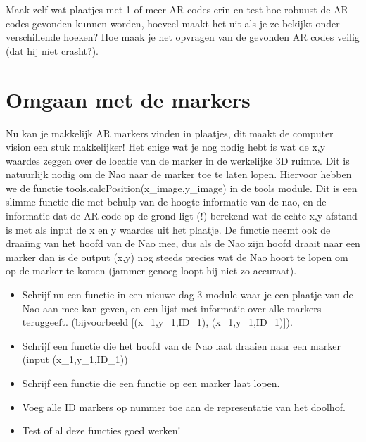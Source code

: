 \documentclass[a4paper]{article}
\begin{document}
\begin{Exercise}
Maak zelf wat plaatjes met 1 of meer AR codes erin en test hoe robuust de AR codes gevonden kunnen worden, hoeveel maakt het uit als je ze bekijkt onder verschillende hoeken? Hoe maak je het opvragen van de gevonden AR codes veilig (dat hij niet crasht?). 
\end{Exercise}
\vspace{10 mm}

\section{Omgaan met de markers}

Nu kan je makkelijk AR markers vinden in plaatjes, dit maakt de computer vision een stuk makkelijker! Het enige wat je nog nodig hebt is wat de x,y waardes zeggen over de locatie van de marker in de werkelijke 3D ruimte. Dit is natuurlijk nodig om de Nao naar de marker toe te laten lopen. Hiervoor hebben we de functie tools.calcPosition(x\_image,y\_image) in de tools module. Dit is een slimme functie die met behulp van de hoogte informatie van de nao, en de informatie dat de AR code op de grond ligt (!) berekend wat de echte x,y afstand is met als input de x en y waardes uit het plaatje. De functie neemt ook de draaiïng van het hoofd van de Nao mee, dus als de Nao zijn hoofd draait naar een marker dan is de output (x,y) nog steeds precies wat de Nao hoort te lopen om op de marker te komen (jammer genoeg loopt hij niet zo accuraat).

\begin{Exercise}
\begin{itemize}
\item Schrijf nu een functie in een nieuwe dag 3 module waar je een plaatje van de Nao aan mee kan geven, en een lijst met informatie over alle markers teruggeeft. (bijvoorbeeld [(x\_1,y\_1,ID\_1), (x\_1,y\_1,ID\_1)]).
\item Schrijf een functie die het hoofd van de Nao laat draaien naar een marker (input (x\_1,y\_1,ID\_1))
\item Schrijf een functie die een functie op een marker laat lopen.
\item Voeg alle ID markers op nummer toe aan de representatie van het doolhof.
\item Test of al deze functies goed werken!
\end{itemize}
\end{Exercise}
\vspace{10 mm}
\end{document}

